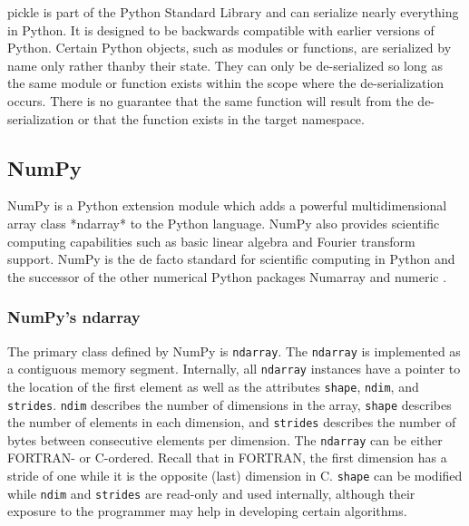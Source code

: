 \documentclass{sigplanconf}
\begin{document}
pickle is part of the Python Standard Library \cite{Lun01} and can serialize
nearly everything in Python. It is designed to be backwards compatible with
earlier versions of Python. Certain Python objects, such as modules or
functions, are serialized by name only rather thanby their state. They can
only be de-serialized so long as the same module or function exists within the
scope where the de-serialization occurs. There is no guarantee that the same
function will result from the de-serialization or that the function exists in
the target namespace.

\subsection{NumPy}

NumPy \cite{Oli06} is a Python extension module which adds a powerful
multidimensional array class *ndarray* to the Python language. NumPy also
provides scientific computing capabilities such as basic linear algebra and
Fourier transform support. NumPy is the de facto standard for scientific
computing in Python and the successor of the other numerical Python packages
Numarray \cite{Dub96} and numeric \cite{Asc99}.

\subsubsection{NumPy's ndarray}

The primary class defined by NumPy is \verb=ndarray=. The \verb=ndarray= is
implemented as a contiguous memory segment. Internally, all \verb=ndarray=
instances have a pointer to the location of the first element as well as the
attributes \verb=shape=, \verb=ndim=, and \verb=strides=. \verb=ndim=
describes the number of dimensions in the array, \verb=shape= describes the
number of elements in each dimension, and \verb=strides= describes the number
of bytes between consecutive elements per dimension. The \verb=ndarray= can be
either FORTRAN- or C-ordered.  Recall that in FORTRAN, the first dimension has
a stride of one while it is the opposite (last) dimension in C. \verb=shape=
can be modified while \verb=ndim= and \verb=strides= are read-only and used
internally, although their exposure to the programmer may help in developing
certain algorithms.
\end{document}
